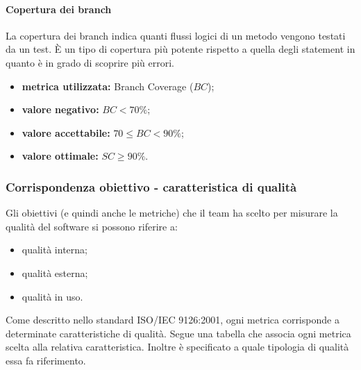		\paragraph{Copertura dei branch}
			\label{OCDB}
			La copertura dei branch indica quanti flussi logici di un metodo vengono testati da un test. È un tipo di copertura più potente rispetto a quella degli statement in quanto è in grado di scoprire più errori.
		
			\begin{itemize}
				\item \textbf{metrica utilizzata:} Branch Coverage ($BC$);
				\item \textbf{valore negativo:} $BC< 70\%$;
				\item \textbf{valore accettabile:} $70\leq BC<90\%$;
				\item \textbf{valore ottimale:} $SC\geq 90\%$.
			\end{itemize}		

	\subsubsection{Corrispondenza obiettivo - caratteristica di qualità}
		Gli obiettivi (e quindi anche le metriche) che il team ha scelto per misurare la qualità del software si possono riferire a:
		\begin{itemize}
			\item qualità interna;
			\item qualità esterna;
			\item qualità in uso.
		\end{itemize}
		Come descritto nello standard ISO/IEC 9126:2001, ogni metrica corrisponde a determinate caratteristiche di qualità. Segue una tabella che associa ogni metrica scelta alla relativa caratteristica. Inoltre è specificato a quale tipologia di qualità essa fa riferimento.
		
